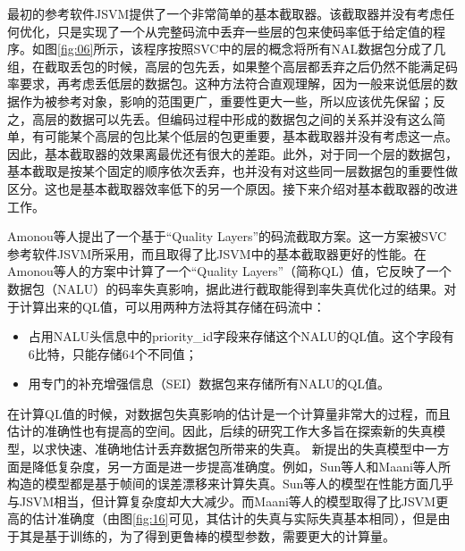 最初的参考软件JSVM提供了一个非常简单的基本截取器。该截取器并没有考虑任何优化，只是实现了一个从完整码流中丢弃一些层的包来使码率低于给定值的程序。如图\ref{fig:06}\supercite{Amonou2007}所示，该程序按照SVC中的层的概念将所有NAL数据包分成了几组，在截取丢包的时候，高层的包先丢，如果整个高层都丢弃之后仍然不能满足码率要求，再考虑丢低层的数据包。这种方法符合直观理解，因为一般来说低层的数据作为被参考对象，影响的范围更广，重要性更大一些，所以应该优先保留；反之，高层的数据可以先丢。但编码过程中形成的数据包之间的关系并没有这么简单，有可能某个高层的包比某个低层的包更重要，基本截取器并没有考虑这一点。因此，基本截取器的效果离最优还有很大的差距。此外，对于同一个层的数据包，基本截取是按某个固定的顺序依次丢弃，也并没有对这些同一层数据包的重要性做区分。这也是基本截取器效率低下的另一个原因。接下来介绍对基本截取器的改进工作。

Amonou等人\supercite{Amonou2007}提出了一个基于“Quality Layers”的码流截取方案。这一方案被SVC
参考软件JSVM所采用，而且取得了比JSVM中的基本截取器更好的性能。在Amonou等人的方案中计算了一个“Quality Layers”（简称QL）值，它反映了一个数据包（NALU）的码率失真影响，据此进行截取能得到率失真优化过的结果。对于计算出来的QL值，可以用两种方法将其存储在码流中：

\begin{itemize}
\item 占用NALU头信息中的priority\_id字段来存储这个NALU的QL值。这个字段有6比特，只能存储64个不同值；
\item 用专门的补充增强信息（SEI）数据包来存储所有NALU的QL值。
\end{itemize}

在计算QL值的时候，对数据包失真影响的估计是一个计算量非常大的过程，而且估计的准确性也有提高的空间。因此，后续的研究工作大多旨在探索新的失真模型，以求快速、准确地估计丢弃数据包所带来的失真。
新提出的失真模型中一方面是降低复杂度，另一方面是进一步提高准确度。例如，Sun等人\supercite{Sun2009}和Maani等人\supercite{Maani2009}所构造的模型都是基于帧间的误差漂移来计算失真。Sun等人的模型在性能方面几乎与JSVM相当，但计算复杂度却大大减少。而Maani等人的模型取得了比JSVM更高的估计准确度（由图\ref{fig:16}\supercite{Maani2009}可见，其估计的失真与实际失真基本相同），但是由于其是基于训练的，为了得到更鲁棒的模型参数，需要更大的计算量。

